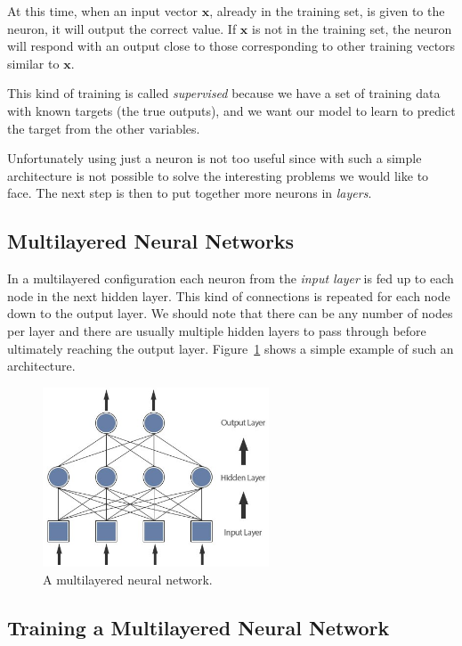 At this time, when an input vector \(\mathbf{x}\), already in the training
set, is given to the neuron, it will output the correct value. If
\(\mathbf{x}\) is not in the training set, the neuron will respond with
an output close to those corresponding to other training vectors similar to \(\mathbf{x}\).

This kind of training is called \emph{supervised} because we have a set of training data with known targets 
(the true outputs), and we want our model to learn to predict the target from the other variables.

Unfortunately using just a neuron is not too useful since with
such a simple architecture is not possible to solve the interesting problems we would like to face. 
The next step is then to put together more neurons in \emph{layers}.

\subsection{Multilayered Neural Networks}\label{multi-layered-neural-networks}

In a multilayered configuration each neuron from the \emph{input layer} 
is fed up to each node in the
next hidden layer. This kind of connections is repeated for each node down to the output layer. 
We should note that there can be any number of nodes per layer and there
are usually multiple hidden layers to pass through before ultimately
reaching the output layer. Figure~\ref{fig:multilayered_nn} shows a simple
example of such an architecture.

\begin{figure}[htb]
	\centering
	\includegraphics[width=0.6\textwidth]{figures/multilayer.jpeg}
	\caption{A multilayered neural network.}
	\label{fig:multilayered_nn}
\end{figure}

\subsection{Training a Multilayered Neural Network}
\label{training-a-multilayered-neural-network}

